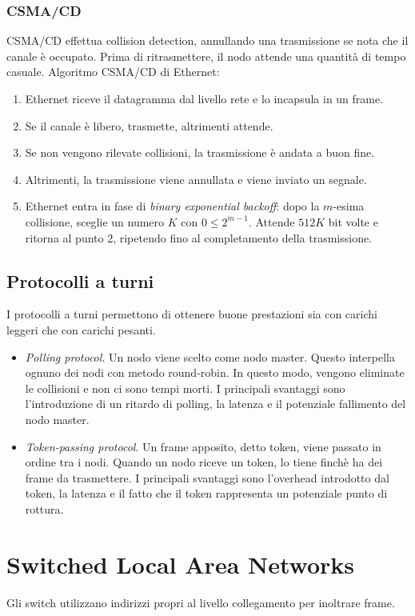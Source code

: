 \documentclass[11pt]{book}
\begin{document}
\subsubsection{CSMA/CD}
CSMA/CD effettua collision detection, annullando una trasmissione se nota che il canale è occupato. Prima di ritrasmettere, 
il nodo attende una quantità di tempo casuale. Algoritmo CSMA/CD di Ethernet:
\begin{enumerate}
    \item Ethernet riceve il datagramma dal livello rete e lo incapsula in un frame.
    \item Se il canale è libero, trasmette, altrimenti attende.
    \item Se non vengono rilevate collisioni, la trasmissione è andata a buon fine.
    \item Altrimenti, la trasmissione viene annullata e viene inviato un segnale.
    \item Ethernet entra in fase di \textit{binary exponential backoff}: dopo la $m$-esima collisione, sceglie un numero 
    $K$ con $0\leq 2^{m-1}$. Attende $512K$ bit volte e ritorna al punto 2, ripetendo fino al completamento della trasmissione.
\end{enumerate}
\subsection{Protocolli a turni}
I protocolli a turni permettono di ottenere buone prestazioni sia con carichi leggeri che con carichi pesanti. 
\begin{itemize}
    \item \textit{Polling protocol}. Un nodo viene scelto come nodo master. Questo interpella ognuno dei nodi con metodo 
    round-robin. In questo modo, vengono eliminate le collisioni e non ci sono tempi morti. I principali svantaggi sono 
    l'introduzione di un ritardo di polling, la latenza e il potenziale fallimento del nodo master.
    \item \textit{Token-passing protocol}. Un frame apposito, detto token, viene passato in ordine tra i nodi. Quando un 
    nodo riceve un token, lo tiene finchè ha dei frame da trasmettere. I principali svantaggi sono l'overhead introdotto 
    dal token, la latenza e il fatto che il token rappresenta un potenziale punto di rottura.
\end{itemize}
\section{Switched Local Area Networks}
Gli switch utilizzano indirizzi propri al livello collegamento per inoltrare frame.
\end{document}
